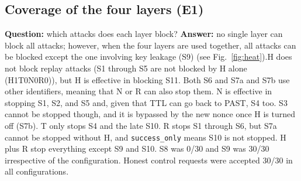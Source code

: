\documentclass[conference]{IEEEtran}
\newcommand{\so}{\texttt{success\_only}}
\begin{document}
\subsection{Coverage of the four layers (E1)}
\textbf{Question:} which attacks does each layer block? \textbf{Answer:} no single layer can block all attacks; however, when the four layers are used together, all attacks can be blocked except the one involving key leakage (S9)  (see Fig.~\ref{fig:heat}).H does not block replay attacks (S1 through S5 are not blocked by H alone (H1T0N0R0)), but H is effective in blocking S11. Both S6 and S7a and S7b use other identifiers, meaning that N or R can also stop them. N is effective in stopping S1, S2, and S5 and, given that TTL can go back to PAST, S4 too. S3 cannot be stopped though, and it is bypassed by the new nonce once H is turned off (S7b). T only stops S4 and the late S10. R stops S1 through S6, but S7a cannot be stopped without H, and \so{} means S10 is not stopped. H plus R stop everything except S9 and S10. S8 was 0/30 and S9 was 30/30 irrespective of the configuration. Honest control requests were accepted 30/30 in all configurations.
\end{document}
